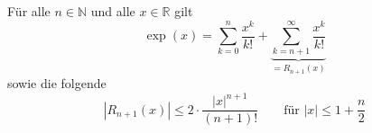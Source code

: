 Für alle $n \in \mathbb{N}$ und alle $x \in \mathbb{R}$ gilt
$$\exp(x) = \sum_{k=0}^n \frac{x^k}{k!}+\underbrace{\sum_{k=n+1}^\infty \frac{x^k}{k!}}_{=R_{n+1}(x)}$$
sowie die folgende 
$$|R_{n+1}(x)| \leq 2 \cdot \frac{|x|^{n+1}}{(n+1)!} \qquad \text{für $|x| \leq 1 + \frac{n}{2}$}$$